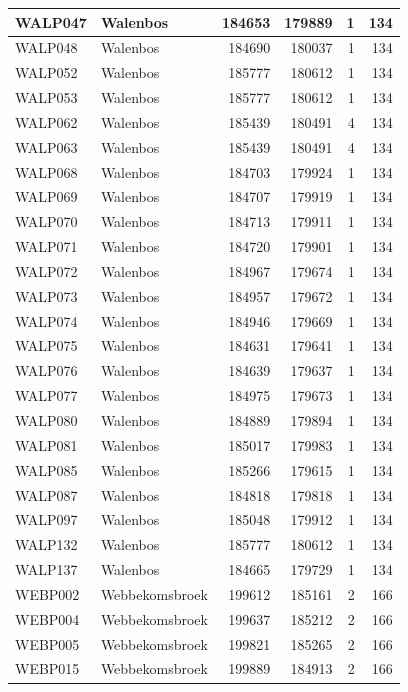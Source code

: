 \documentclass[11pt,]{book}
\begin{document}
\begin{table}
\begin{tabular}[t]{l|l|r|r|r|r}
\hline
WALP047 & Walenbos & 184653 & 179889 & 1 & 134\\
\hline
WALP048 & Walenbos & 184690 & 180037 & 1 & 134\\
\hline
WALP052 & Walenbos & 185777 & 180612 & 1 & 134\\
\hline
WALP053 & Walenbos & 185777 & 180612 & 1 & 134\\
\hline
WALP062 & Walenbos & 185439 & 180491 & 4 & 134\\
\hline
WALP063 & Walenbos & 185439 & 180491 & 4 & 134\\
\hline
WALP068 & Walenbos & 184703 & 179924 & 1 & 134\\
\hline
WALP069 & Walenbos & 184707 & 179919 & 1 & 134\\
\hline
WALP070 & Walenbos & 184713 & 179911 & 1 & 134\\
\hline
WALP071 & Walenbos & 184720 & 179901 & 1 & 134\\
\hline
WALP072 & Walenbos & 184967 & 179674 & 1 & 134\\
\hline
WALP073 & Walenbos & 184957 & 179672 & 1 & 134\\
\hline
WALP074 & Walenbos & 184946 & 179669 & 1 & 134\\
\hline
WALP075 & Walenbos & 184631 & 179641 & 1 & 134\\
\hline
WALP076 & Walenbos & 184639 & 179637 & 1 & 134\\
\hline
WALP077 & Walenbos & 184975 & 179673 & 1 & 134\\
\hline
WALP080 & Walenbos & 184889 & 179894 & 1 & 134\\
\hline
WALP081 & Walenbos & 185017 & 179983 & 1 & 134\\
\hline
WALP085 & Walenbos & 185266 & 179615 & 1 & 134\\
\hline
WALP087 & Walenbos & 184818 & 179818 & 1 & 134\\
\hline
WALP097 & Walenbos & 185048 & 179912 & 1 & 134\\
\hline
WALP132 & Walenbos & 185777 & 180612 & 1 & 134\\
\hline
WALP137 & Walenbos & 184665 & 179729 & 1 & 134\\
\hline
WEBP002 & Webbekomsbroek & 199612 & 185161 & 2 & 166\\
\hline
WEBP004 & Webbekomsbroek & 199637 & 185212 & 2 & 166\\
\hline
WEBP005 & Webbekomsbroek & 199821 & 185265 & 2 & 166\\
\hline
WEBP015 & Webbekomsbroek & 199889 & 184913 & 2 & 166\\

\end{tabular}
\end{table}
\end{document}
